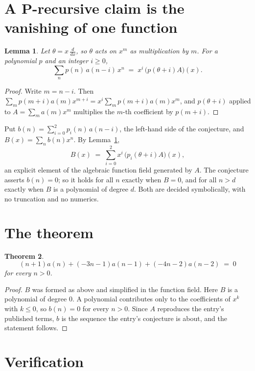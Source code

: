 \documentclass[11pt,a4paper]{article}
\theoremstyle{plain}
\newtheorem{theorem}{Theorem}
\newtheorem{lemma}[theorem]{Lemma}
\theoremstyle{definition}
\begin{document}
\section{A P-recursive claim is the vanishing of one function}

\begin{lemma}\label{lem:theta}
Let $\theta=x\,\frac{d}{dx}$, so $\theta$ acts on $x^m$ as multiplication by $m$. For a
polynomial $p$ and an integer $i\ge0$,
\[
\sum_{n} p(n)\,a(n-i)\,x^{n}\;=\;x^{i}\,\bigl(p(\theta+i)A\bigr)(x).
\]
\end{lemma}

\begin{proof}
Write $m=n-i$. Then $\sum_m p(m+i)a(m)x^{m+i}=x^i\sum_m p(m+i)a(m)x^m$, and $p(\theta+i)$
applied to $A=\sum_m a(m)x^m$ multiplies the $m$-th coefficient by $p(m+i)$.
\end{proof}

Put $b(n)=\sum_{i=0}^{2}p_i(n)\,a(n-i)$, the left-hand side of the conjecture, and
$B(x)=\sum_n b(n)x^n$. By Lemma~\ref{lem:theta},
\[
B(x)\;=\;\sum_{i=0}^{2}x^{i}\,\bigl(p_i(\theta+i)A\bigr)(x),
\]
an explicit element of the algebraic function field generated by $A$. The conjecture asserts
$b(n)=0$; so it holds for all $n$ exactly when $B=0$, and for all $n>d$ exactly when $B$ is a
polynomial of degree $d$. Both are decided symbolically, with no truncation and no numerics.

\section{The theorem}

\begin{theorem}
\[
\left(n + 1\right)a(n) + \left(- 3 n - 1\right)a(n-1) + \left(- 4 n - 2\right)a(n-2)\;=\;0
\]
for every $n>0$.
\end{theorem}

\begin{proof}
$B$ was formed as above and simplified in the function field. Here $B$ is a polynomial of degree $0$. A polynomial contributes only to the coefficients of $x^k$ with $k\le0$, so $b(n)=0$ for every $n>0$. Since $A$ reproduces the
entry's published terms, $b$ is the sequence the entry's conjecture is about, and the statement
follows.
\end{proof}

\section{Verification}
\end{document}
